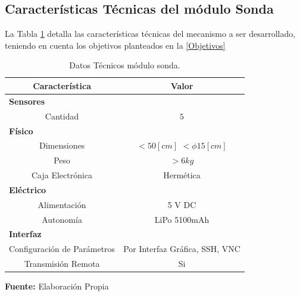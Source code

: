 \subsection[Características Técnicas del m\'odulo Sonda]{Características Técnicas del m\'odulo Sonda}
La Tabla \ref{tab:carac_general2} detalla las características técnicas del mecanismo a ser desarrollado, teniendo en cuenta los objetivos planteados en la \autoref{Objetivos}
\begin{table}[ht]
    \caption[Datos Técnicos m\'odulo sonda]{Datos Técnicos m\'odulo sonda.}
    \label{tab:carac_general2} 
    \centering
    {\begin{tabular}{c c}
        \textbf{Característica} & \textbf{Valor}  \\
        \hline
        \multicolumn{2}{l}{\textbf{Sensores}} \\
        Cantidad & $ 5 $   \\
        \multicolumn{2}{l}{\textbf{Físico}} \\
        Dimensiones & $< 50 [cm]$  $< \phi 15[cm]$   \\
        Peso &  $ > 6 kg$ \\
        Caja Electrónica & Herm\'etica  \\
        \multicolumn{2}{l}{\textbf{Eléctrico}} \\
         Alimentación & 5 V DC  \\
         Autonomía & LiPo 5100mAh  \\
         \multicolumn{2}{l}{\textbf{Interfaz}} \\
         Configuración de Parámetros & Por Interfaz Gráfica, SSH, VNC  \\
         Transmisi\'on Remota  & Si  \\
        \hline
    \end{tabular}}
    \vspace{5mm}
    \newline
    \hfill \textbf{Fuente:} Elaboración Propia
\end{table}

